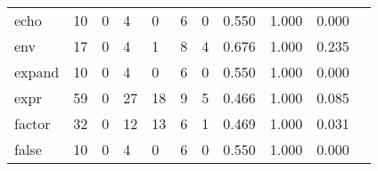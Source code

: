 \begin{longtable}{lp{1.20cm}p{1.20cm}p{1.20cm}p{1.20cm}p{1.20cm}p{1.20cm}p{1.20cm}p{1.20cm}p{1.20cm}p{1.20cm}}
echo      &                                    10 &                                                  0 &                                                  4 &                                                  0 &                                                  6 &                                                  0 &                                         0.550 &                                              1.000 &                                              0.000 \\
env       &                                    17 &                                                  0 &                                                  4 &                                                  1 &                                                  8 &                                                  4 &                                         0.676 &                                              1.000 &                                              0.235 \\
expand    &                                    10 &                                                  0 &                                                  4 &                                                  0 &                                                  6 &                                                  0 &                                         0.550 &                                              1.000 &                                              0.000 \\
expr      &                                    59 &                                                  0 &                                                 27 &                                                 18 &                                                  9 &                                                  5 &                                         0.466 &                                              1.000 &                                              0.085 \\
factor    &                                    32 &                                                  0 &                                                 12 &                                                 13 &                                                  6 &                                                  1 &                                         0.469 &                                              1.000 &                                              0.031 \\
false     &                                    10 &                                                  0 &                                                  4 &                                                  0 &                                                  6 &                                                  0 &                                         0.550 &                                              1.000 &                                              0.000 \\

\end{longtable}
